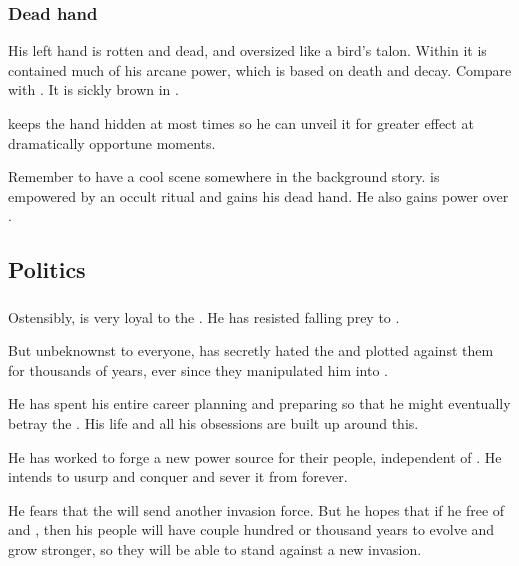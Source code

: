 \subsubsection{Dead hand}
His left hand is rotten and dead, and oversized like a bird's talon. 
Within it is contained much of his arcane power, which is based on death and decay. 
Compare with .
It is sickly brown in \colour. 

\Azraid keeps the hand hidden at most times so he can unveil it for greater effect at dramatically opportune moments. 

Remember to have a cool scene somewhere in the background story. 
\Azraid{} is empowered by an occult ritual and gains his dead hand. 
He also gains power over . 









\subsection{Politics}





\subsubsection{\Banes}
Ostensibly, \Azraid{} is very loyal to the \banes. 
He has resisted falling prey to . 

But unbeknownst to everyone, \Azraid{} has secretly hated the \banelords{} and plotted against them for thousands of years, ever since they manipulated him into . 

He has spent his entire career planning and preparing so that he might eventually betray the \banes. 
His life and all his obsessions are built up around this. 

He has worked to forge a new power source for their people, independent of \Erebos. 
He intends to usurp and conquer \Nyx{} and sever it from \Erebos{} forever. 

He fears that the \banes{} will send another invasion force. 
But he hopes that if he free \Miith{} of \Iquin{} and \Daggerrain, then his people will have couple hundred or thousand years to evolve and grow stronger, so they will be able to stand against a new invasion. 

